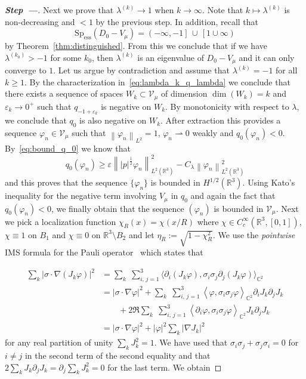 \documentclass[AHL,Unicode,published]{cedram}
\newcommand{\R}{\mathbb{R}}
\newcommand{\C}{\mathbb{C}}
\newcommand{\cV}{\mathcal{V}}
\newcommand{\Spec}{\mathrm{Sp}}
\DeclareMathOperator{\ess}{ess}
\newcommand\1{{\ensuremath {\mathds 1} }}
\renewcommand\phi{\varphi}
\newcommand{\wto}{\rightharpoonup}
\newcommand{\ii}{\infty}
\newcommand\pscal[1]{{\ensuremath{\left\langle #1 \right\rangle}}}
\newcommand{\norm}[1]{ \left\| #1 \right\|}
\renewcommand{\geq}{\geqslant}
\newcommand{\eps}{\varepsilon}
\newcounter{stepcount}
\newenvironment{step}[1]{\refstepcounter{stepcount}\begin{proof}[\bf{Step~\thestepcount\;---\;{#1}}]}{\let\qed\relax\end{proof}}
\begin{document}
\begin{step}{Proof of $\lambda^{(k)}\nearrow 1$.}
Next we prove that $\lambda^{(k)}\to1$ when $k\to\ii$. Note that $k\mapsto\lambda^{(k)}$ is non-decreasing and $<1$ by the previous step. In addition, recall that
\[
\Spec_{\ess}\left(D_0-V_\mu\right)=\left(-\ii,-1\right]\,\cup\,\left[1\cup\ii\right)
\]
by Theorem~\ref{thm:distinguished}. From this we conclude that if we have $\lambda^{(k_0)}>-1$ for some $k_0$, then $\lambda^{(k)}$ is an eigenvalue of $D_0-V_\mu$ and it can only converge to $1$. Let us argue by contradiction and assume that $\lambda^{(k)}=-1$ for all $k\geq1$. By the characterization in~\eqref{eq:lambda_k_q_lambda} we conclude that there exists a sequence of spaces $W_k\subset \cV_\mu$ of dimension $\dim(W_k)=k$ and $\eps_k\to0^+$ such that $q_{-1+\eps_k}$ is negative on $W_k$. By monotonicity with respect to $\lambda$, we conclude that $q_0$ is also negative on $W_k$. After extraction this provides a sequence $\phi_n\in\cV_\mu$ such that $\norm{\phi_n}_{L^2}=1$, $\phi_n\wto0$ weakly and $q_{0}(\phi_n)<0$. By~\eqref{eq:bound_q_0} we know that
\[
q_0(\phi_n)\geq \eps\norm{|p|^{\frac12}\phi_n}^2_{L^2\left(\R^3\right)}-C_\lambda\norm{\phi_n}_{L^2\left(\R^3\right)}^2
\]
and this proves that the sequence $\{\phi_n\}$ is bounded in $H^{1/2}(\R^3)$. Using Kato's inequality for the negative term involving $V_\mu$ in $q_0$ and again the fact that $q_0(\phi_n)<0$, we finally obtain that the sequence $(\phi_n)$ is bounded in $\cV_\mu$. Next we pick a localization function $\chi_R(x)=\chi(x/R)$ where $\chi\in C^\ii_c(\R^3,[0,1])$, $\chi\equiv1$ on $B_1$ and $\chi\equiv0$ on $\R^3\setminus B_2$ and let $\eta_R:=\sqrt{1-\chi_R^2}$. We use the \emph{pointwise} IMS formula for the Pauli operator~\cite{BosDolEst-08} which states that

\begin{equation}\label{eq:IMS}
\begin{aligned}
\sum_k\left|\sigma\cdot\nabla (J_k\phi)\right|^2&=\sum_k\;\sum_{i,\,j=1}^3\big\langle\partial_i(J_k\phi),\sigma_i\sigma_j \partial_j(J_k\phi)\big\rangle_{\C^2}\\
&=\left|\sigma\cdot \nabla\phi\right|^2+\sum_k\;\sum_{i,\,j=1}^3\pscal{\phi,\sigma_i\sigma_j \phi}_{\C^2}\partial_iJ_k\partial_j J_k\\
&\qquad+2\Re\sum_k\;\sum_{i,\,j=1}^3\pscal{\partial_i\phi,\sigma_i\sigma_j \phi}_{\C^2}J_k\partial_j J_k\\
&=\left|\sigma\cdot \nabla\phi\right|^2+|\phi|^2\sum_k \left|\nabla J_k\right|^2
\end{aligned}
\end{equation}
for any real partition of unity $\sum_k J_k^2=1$. We have used that $\sigma_i\sigma_j+\sigma_j\sigma_i=0$ for $i\neq j$ in the second term of the second equality and that $2\sum_k J_k\partial_j J_k=\partial_j\sum_k J_k^2=0$ for the last term. We obtain


\end{step}
\end{document}
